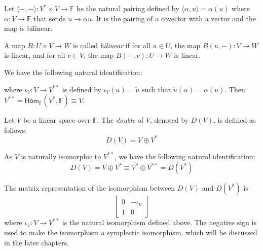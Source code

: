 \documentclass[
	11pt, %
	fleqn, %
	a4paper, %
]{LegrandOrangeBook}
\newcommand{\Hom}{\mathsf{Hom}} %
\newcommand{\F}{\mathbb{F}} %
\newcommand{\vequiv}{\rotatebox{90}{$\equiv$}}
\begin{document}
Let $\langle-,-\rangle : V^* \times V \to \F$ be the natural pairing defined by $\langle\alpha, u\rangle = \alpha(u)$ where $\alpha : V \to \F$ that sends $u \to \alpha{u}$. It is the pairing of a covector with a vector and the map is bilinear.

\begin{definition}
    A map $B : U \times V \to W$ is called \emph{bilinear} if for all $u \in U$, the map $B(u, -) : V \to W$ is linear, and for all $v \in V$, the map $B(-, v) : U \to W$ is linear.
\end{definition}

We have the following natural identification:
\begin{center}
\end{center}
where $\iota_V : V \to V^{**}$ is defined by $\iota_V(u) = \check{u}$ such that $\check{u}(\alpha) = \alpha(u)$. Then $V^{**} = \Hom_{\F}(V^*, \F) \equiv V$.

\begin{definition}[Doubles]
    Let $V$ be a linear space over $\F$. The \emph{double} of $V$, denoted by $D(V)$, is defined as follows:
    \[
        D(V) = V \oplus V^*
    \]
\end{definition}

As $V$ is naturally isomorphic to $V^{**}$, we have the following natural identification:
\[
    D(V) = V \oplus V^* \equiv V^* \oplus V^{**} = D(V^*)
\]

The matrix representation of the isomorphism between $D(V)$ and $D(V^*)$ is
\[
    \begin{bmatrix}
        0 & -\iota_V \\
        1 & 0
    \end{bmatrix}
\]
where $\iota_V : V \to V^{**}$ is the natural isomorphism defined above. The negative sign is used to make the isomorphism a symplectic isomorphism, which will be discussed in the later chapters.
\end{document}
